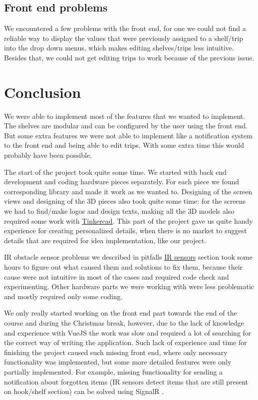 \documentclass{article}
\begin{document}
\subsection{Front end problems}
\label{sec:front}
We encountered a few problems with the front end, for one we could not find a reliable way to display the values that were previously assigned to a shelf/trip into the drop down menus, which makes editing shelves/trips less intuitive. Besides that, we could not get editing trips to work because of the previous issue.

\newpage

\section{Conclusion}
We were able to implement most of the features that we wanted to implement. The shelves are modular and can be configured by the user using the front end. But some extra features we were not able to implement like a notification system to the front end and being able to edit trips. With some extra time this would probably have been possible.

The start of the project took quite some time. We started with back end development and coding hardware pieces separately. For each piece we found corresponding library and made it work as we wanted to. Designing of the screen views and designing of the 3D pieces also took quite some time: for the screens we had to find/make logos and design texts, making all the 3D models also required some work with \href{https://www.tinkercad.com}{Tinkercad}. This part of the project gave us quite handy experience for creating personalized details, when there is no market to suggest details that are required for idea implementation, like our project.

IR obstacle sensor problems we described in pitfalls \hyperref[sec:ir]{IR sensors} section took some hours to figure out what caused them and solutions to fix them, because their cause were not intuitive in most of the cases and required code check and experimenting. Other hardware parts we were working with were less problematic and mostly required only some coding. 

We only really started working on the front end part towards the end of the course and during the Christmas break, however, due to the lack of knowledge and experience with VueJS the work was slow and required a lot of searching for the correct way of writing the application. Such lack of experience and time for finishing the project caused such missing front end, where only necessary functionality was implemented, but some more detailed features were only partially implemented. For example, missing functionality for sending a notification about forgotten items (IR sensors detect items that are still present on hook/shelf section) can be solved using SignalR \cite{signalr}.
\end{document}
